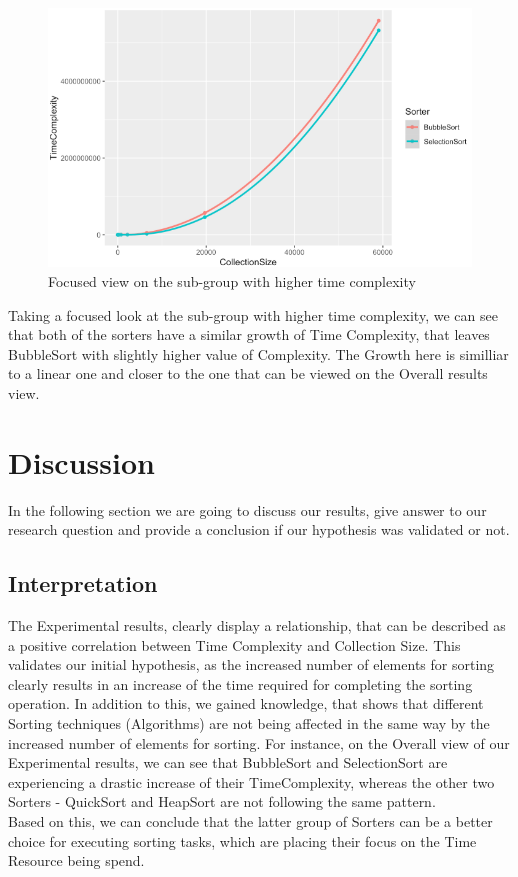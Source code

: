 \documentclass[]{report}
\begin{document}
\begin{figure}
	\centering
	\includegraphics[width=0.7\linewidth]{FocusedViewOnBigTimeComplexity}
	\caption[Figure 3.3]{Focused view on the sub-group with higher time complexity}
	\label{fig:focusedviewonbigtimecomplexity}
\end{figure}
\newpage
Taking a focused look at the sub-group with higher time complexity, we can see that both of the sorters have a similar growth of Time Complexity, that leaves BubbleSort with slightly higher value of Complexity. The Growth here is similliar to a linear one and closer to the one that can be viewed on the Overall results view.
\section{Discussion}
In the following section we are going to discuss our results, give answer to our research question and provide a conclusion if our hypothesis was validated or not.
\subsection{Interpretation}
The Experimental results, clearly display a relationship, that can be described as a  positive correlation between Time Complexity and Collection Size. This validates our initial hypothesis, as the increased number of elements for sorting clearly results in an increase of the time required for completing the sorting operation. In addition to this, we gained knowledge, that shows that different Sorting techniques (Algorithms) are not being affected in the same way by the increased number of elements for sorting. For instance, on the Overall view of our Experimental results, we can see that BubbleSort and SelectionSort are experiencing a drastic increase of their TimeComplexity, whereas the other two Sorters - QuickSort and HeapSort are not following the same pattern.\\
Based on this, we can conclude that the latter group of Sorters can be a better choice for executing sorting tasks, which are placing their focus on the Time Resource being spend.
\end{document}
